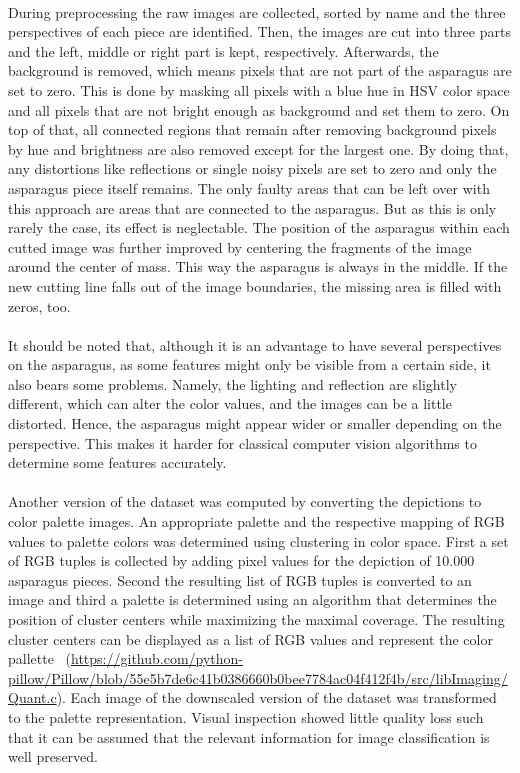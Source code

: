 \\
During preprocessing the raw images are collected, sorted by name and the three perspectives of each piece are identified. Then, the images are cut into three parts and the left, middle or right part is kept, respectively. Afterwards, the background is removed, which means pixels that are not part of the asparagus are set to zero.  This is done by masking all pixels with a blue hue in HSV color space and all pixels that are not bright enough as background and set them to zero. On top of that, all connected regions that remain after removing background pixels by hue and brightness are also removed except for the largest one. By doing that, any distortions like reflections or single noisy pixels are set to zero and only the asparagus piece itself remains. The only faulty areas that can be left over with this approach are areas that are connected to the asparagus. But as this is only rarely the case, its effect is neglectable. The position of the asparagus within each cutted image was further improved by centering the fragments of the image around the center of mass. This way the asparagus is always in the middle. If the new cutting line falls out of the image boundaries, the missing area is filled with zeros, too. \\
\\
It should be noted that, although it is an advantage to have several perspectives on the asparagus, as some features might only be visible from a certain side, it also bears some problems. Namely, the lighting and reflection are slightly different, which can alter the color values, and the images can be a little distorted. Hence, the asparagus might appear wider or smaller depending on the perspective. This makes it harder for classical computer vision algorithms to determine some features accurately. \\
\\
Another version of the dataset was computed by converting the depictions to color palette images. An appropriate palette and the respective mapping of RGB values to palette colors was determined using clustering in color space. First a set of RGB tuples is collected by adding pixel values for the depiction of 10.000 asparagus pieces. Second the resulting list of RGB tuples is converted to an image and third a palette is determined using an algorithm that determines the position of cluster centers while maximizing the  maximal coverage. The resulting cluster centers can be displayed as a list of RGB values and represent the color pallette~\citep{zarandi2011large} (\url{https://github.com/python-pillow/Pillow/blob/55e5b7de6c41b0386660b0bee7784ac04f412f4b/src/libImaging/Quant.c}). Each image of the downscaled version of the dataset was transformed to the palette representation. Visual inspection showed little quality loss such that it can be assumed that the relevant information for image classification is well preserved. \\ 
